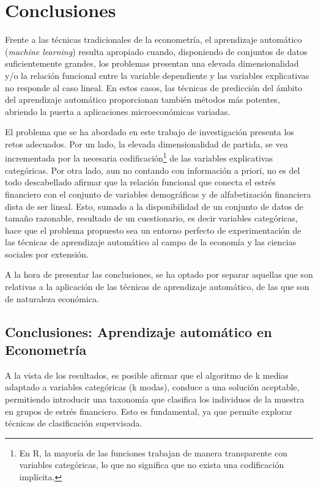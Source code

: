 \documentclass[a4paper, 11pt]{article}
\begin{document}
\section{Conclusiones}
\label{sec:conclusions}
Frente a las técnicas tradicionales de la econometría, el aprendizaje automático 
(\textit{machine learning}) resulta apropiado cuando, disponiendo de conjuntos de
datos suficientemente grandes, los problemas presentan una elevada dimensionalidad
y/o la relación funcional entre la variable dependiente y las variables explicativas
no responde al caso lineal. En estos casos, las técnicas de predicción del ámbito del
aprendizaje automático proporcionan también métodos más potentes, abriendo la puerta a
aplicaciones microeconómicas variadas.

El problema que se ha abordado en este trabajo de investigación presenta los retos 
adecuados. Por un lado, la elevada dimensionalidad de partida, se vea incrementada
por la necesaria codificación\footnote{En R, la mayoría de las funciones trabajan
de manera transparente con variables categóricas, lo que no significa que no exista una
codificación implícita.} de las variables explicativas categóricas. Por otra lado, 
aun no contando con información a priori,  no es del todo descabellado afirmar que
la relación funcional que conecta el estrés financiero con el conjunto de variables
demográficas y de alfabetización financiera dista de ser lineal. Esto, sumado a la 
disponibilidad de un conjunto de datos de tamaño razonable, resultado de un 
cuestionario, es decir variables categóricas, hace que el problema 
propuesto sea un entorno perfecto de experimentación de las técnicas de aprendizaje
automático al campo de la economía y las ciencias sociales por extensión.

A la hora de presentar las conclusiones, se ha optado por separar aquellas que son
relativas a la aplicación de las técnicas de aprendizaje automático, de las que son
de naturaleza económica. 

\subsection{Conclusiones: Aprendizaje automático en Econometría}
\label{sec:sub:conclusions_ml}
A la vista de los resultados, es posible afirmar que el algoritmo de k medias adaptado
a variables categóricas (k modas), conduce a una solución aceptable, permitiendo introducir
una taxonomía que clasifica los individuos de la muestra en grupos de estrés financiero. 
Esto es fundamental, ya que permite explorar técnicas de clasificación supervisada. 
\end{document}
